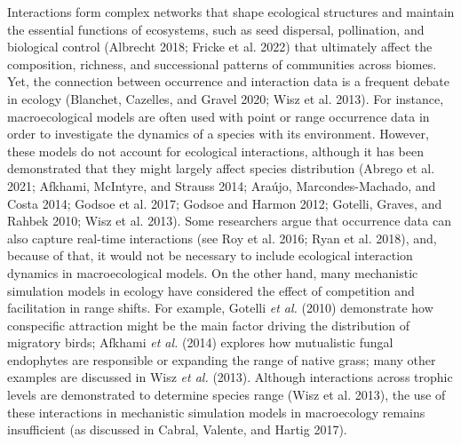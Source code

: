 \documentclass[10pt,oneside]{article}
\begin{document}
Interactions form complex networks that shape ecological structures and
maintain the essential functions of ecosystems, such as seed dispersal,
pollination, and biological control (Albrecht 2018; Fricke et al. 2022)
that ultimately affect the composition, richness, and successional
patterns of communities across biomes. Yet, the connection between
occurrence and interaction data is a frequent debate in ecology
(Blanchet, Cazelles, and Gravel 2020; Wisz et al. 2013). For instance,
macroecological models are often used with point or range occurrence
data in order to investigate the dynamics of a species with its
environment. However, these models do not account for ecological
interactions, although it has been demonstrated that they might largely
affect species distribution (Abrego et al. 2021; Afkhami, McIntyre, and
Strauss 2014; Araújo, Marcondes-Machado, and Costa 2014; Godsoe et al.
2017; Godsoe and Harmon 2012; Gotelli, Graves, and Rahbek 2010; Wisz et
al. 2013). Some researchers argue that occurrence data can also capture
real-time interactions (see Roy et al. 2016; Ryan et al. 2018), and,
because of that, it would not be necessary to include ecological
interaction dynamics in macroecological models. On the other hand, many
mechanistic simulation models in ecology have considered the effect of
competition and facilitation in range shifts. For example, Gotelli
\emph{et al.} (2010) demonstrate how conspecific attraction might be the
main factor driving the distribution of migratory birds; Afkhami
\emph{et al.} (2014) explores how mutualistic fungal endophytes are
responsible or expanding the range of native grass; many other examples
are discussed in Wisz \emph{et al.} (2013). Although interactions across
trophic levels are demonstrated to determine species range (Wisz et al.
2013), the use of these interactions in mechanistic simulation models in
macroecology remains insufficient (as discussed in Cabral, Valente, and
Hartig 2017).
\end{document}
